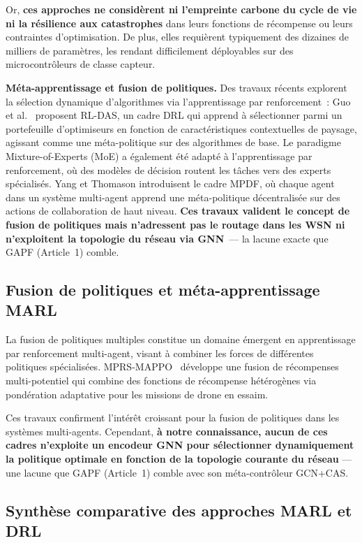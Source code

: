 Or, \textbf{ces approches ne considèrent ni l'empreinte carbone du cycle de vie ni la résilience aux catastrophes} dans leurs fonctions de récompense ou leurs contraintes d'optimisation. De plus, elles requièrent typiquement des dizaines de milliers de paramètres, les rendant difficilement déployables sur des microcontrôleurs de classe capteur.

\textbf{Méta-apprentissage et fusion de politiques.} Des travaux récents explorent la sélection dynamique d'algorithmes via l'apprentissage par renforcement~: Guo et al.\ \cite{guo2024rldas} proposent RL-DAS, un cadre DRL qui apprend à sélectionner parmi un portefeuille d'optimiseurs en fonction de caractéristiques contextuelles de paysage, agissant comme une méta-politique sur des algorithmes de base. Le paradigme Mixture-of-Experts (MoE) a également été adapté à l'apprentissage par renforcement, où des modèles de décision routent les tâches vers des experts spécialisés. Yang et Thomason \cite{yang2025meta_deliberation} introduisent le cadre MPDF, où chaque agent dans un système multi-agent apprend une méta-politique décentralisée sur des actions de collaboration de haut niveau. \textbf{Ces travaux valident le concept de fusion de politiques mais n'adressent pas le routage dans les WSN ni n'exploitent la topologie du réseau via GNN}~--- la lacune exacte que GAPF (Article~1) comble.

\subsection{Fusion de politiques et méta-apprentissage MARL}\label{sec:revlit-policy-fusion}

La fusion de politiques multiples constitue un domaine émergent en apprentissage par renforcement multi-agent, visant à combiner les forces de différentes politiques spécialisées.
MPRS-MAPPO~\cite{mprs_mappo2025} développe une fusion de récompenses multi-potentiel qui combine des fonctions de récompense hétérogènes via pondération adaptative pour les missions de drone en essaim.

Ces travaux confirment l'intérêt croissant pour la fusion de politiques dans les systèmes multi-agents. Cependant, \textbf{à notre connaissance, aucun de ces cadres n'exploite un encodeur GNN pour sélectionner dynamiquement la politique optimale en fonction de la topologie courante du réseau} --- une lacune que GAPF (Article~1) comble avec son méta-contrôleur GCN+CAS.

\subsection{Synthèse comparative des approches MARL et DRL}


